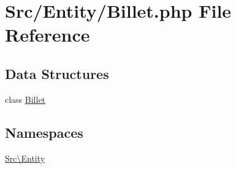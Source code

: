 \hypertarget{_billet_8php}{}\section{Src/\+Entity/\+Billet.php File Reference}
\label{_billet_8php}
\subsection*{Data Structures}
\begin{DoxyCompactItemize}
\item 
class \hyperlink{class_src_1_1_entity_1_1_billet}{Billet}
\end{DoxyCompactItemize}
\subsection*{Namespaces}
\begin{DoxyCompactItemize}
\item 
 \hyperlink{namespace_src_1_1_entity}{Src\textbackslash{}\+Entity}
\end{DoxyCompactItemize}
